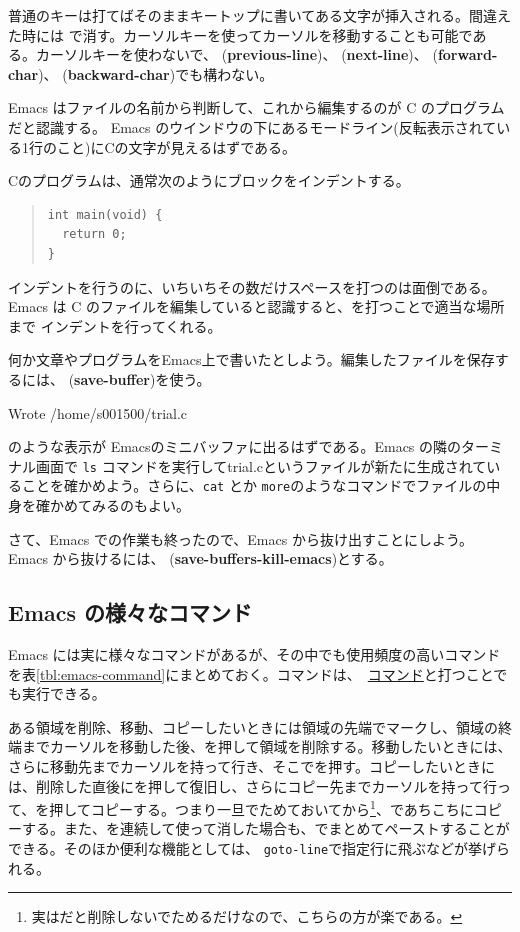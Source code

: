 普通のキーは打てばそのままキートップに書いてある文字が挿入される。間違えた時には \BS で消す。カーソルキーを使ってカーソルを移動することも可能である。カーソルキーを使わないで、 ({\bf previous-line})、 ({\bf next-line})、
 ({\bf forward-char})、 ({\bf backward-char})でも構わない。

Emacs はファイルの名前から判断して、これから編集するのが C のプログラムだと認識する。
Emacs のウインドウの下にあるモードライン(反転表示されている1行のこと)にCの文字が見えるはずである。

Cのプログラムは、通常次のようにブロックをインデントする。
\begin{quote}
    \begin{verbatim}
int main(void) {
  return 0;
}
\end{verbatim}
\end{quote}
インデントを行うのに、いちいちその数だけスペースを打つのは面倒である。Emacs は C のファイルを編集していると認識すると、を打つことで適当な場所まで
インデントを行ってくれる。

何か文章やプログラムをEmacs上で書いたとしよう。編集したファイルを保存するには、  (\textbf{save-buffer})を使う。
\begin{commandline2}
    Wrote /home/s001500/trial.c
\end{commandline2} \noindent
のような表示が Emacsのミニバッファに出るはずである。Emacs の隣のターミナル画面で \texttt{ls} コマンドを実行してtrial.cというファイルが新たに生成されていることを確かめよう。さらに、\texttt{cat} とか \texttt{more}のようなコマンドでファイルの中身を確かめてみるのもよい。

さて、Emacs での作業も終ったので、Emacs から抜け出すことにしよう。Emacs から抜けるには、  (\textbf{save-buffers-kill-emacs})とする。

\subsection{Emacs の様々なコマンド}
Emacs には実に様々なコマンドがあるが、その中でも使用頻度の高いコマンドを表\ref{tbl:emacs-command}にまとめておく。コマンドは、\ \underline{コマンド}と打つことでも実行できる。

ある領域を削除、移動、コピーしたいときには領域の先端でマークし、領域の終端までカーソルを移動した後、を押して領域を削除する。移動したいときには、さらに移動先までカーソルを持って行き、そこでを押す。コピーしたいときには、削除した直後にを押して復旧し、さらにコピー先までカーソルを持って行って、を押してコピーする。つまり一旦でためておいてから\footnote{実はだと削除しないでためるだけなので、こちらの方が楽である。}、であちこちにコピーする。また、を連続して使って消した場合も、でまとめてペーストすることができる。そのほか便利な機能としては、 \texttt{goto-line}で指定行に飛ぶなどが挙げられる。

